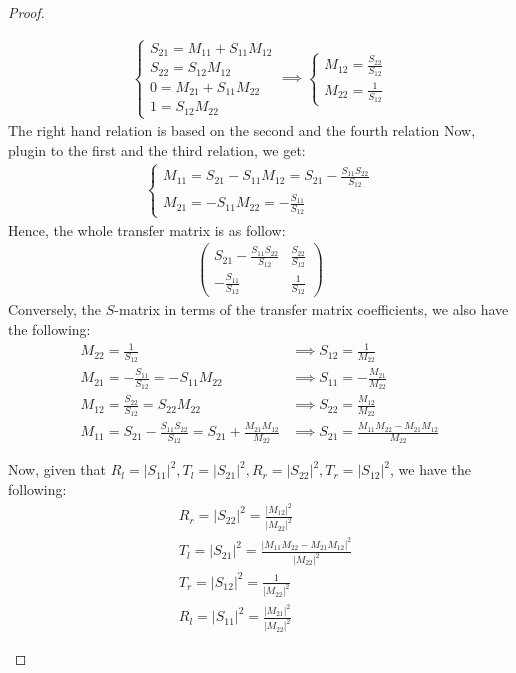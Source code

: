 \documentclass{article}
\begin{document}
\begin{proof}
\begin{itemize}
    \begin{align}
        \begin{cases}
            S_{21}=M_{11}+S_{11}M_{12}\\
            S_{22}=S_{12}M_{12}\\
            0=M_{21}+S_{11}M_{22}\\
            1=S_{12}M_{22}
        \end{cases}\implies \begin{cases}
            M_{12}=\frac{S_{22}}{S_{12}}\\
            M_{22}=\frac{1}{S_{12}}
        \end{cases}
    \end{align}
    The right hand relation is based on the second and the fourth relation Now, plugin to the first and the third relation, we get:
    \begin{align}
        \begin{cases}
            M_{11} = S_{21}-S_{11}M_{12} = S_{21}-\frac{S_{11}S_{22}}{S_{12}}\\
            M_{21} = -S_{11}M_{22}=-\frac{S_{11}}{S_{12}}
        \end{cases}
    \end{align}
    Hence, the whole transfer matrix is as follow:
    \begin{align}
        \begin{pmatrix}
            S_{21}-\frac{S_{11}S_{22}}{S_{12}} & \frac{S_{22}}{S_{12}}\\ -\frac{S_{11}}{S_{12}} & \frac{1}{S_{12}}
        \end{pmatrix}
    \end{align}
    Conversely, the $S$-matrix in terms of the transfer matrix coefficients, we also have the following:
    \begin{align}
            M_{22}=\frac{1}{S_{12}}&\implies S_{12}=\frac{1}{M_{22}}\\
            M_{21}=-\frac{S_{11}}{S_{12}} = -S_{11}M_{22}&\implies S_{11}=-\frac{M_{21}}{M_{22}}\\
            M_{12}=\frac{S_{22}}{S_{12}}=S_{22}M_{22}&\implies S_{22}=\frac{M_{12}}{M_{22}}\\
            M_{11}=S_{21}-\frac{S_{11}S_{22}}{S_{12}} = S_{21}+\frac{M_{21}M_{12}}{M_{22}}&\implies S_{21} = \frac{M_{11}M_{22}-M_{21}M_{12}}{M_{22}}
    \end{align}

    Now, given that $R_l=|S_{11}|^2, T_l=|S_{21}|^2, R_r=|S_{22}|^2, T_r=|S_{12}|^2$, we have the following:
    \begin{align}
        &R_r = |S_{22}|^2 = \frac{|M_{12}|^2}{|M_{22}|^2}\\
        &T_l = |S_{21}|^2 = \frac{|M_{11}M_{22}-M_{21}M_{12}|^2}{|M_{22}|^2}\\
        &T_r = |S_{12}|^2 = \frac{1}{|M_{22}|^2}\\
        &R_l = |S_{11}|^2 = \frac{|M_{21}|^2}{|M_{22}|^2}
    \end{align}


\end{itemize}
\end{proof}
\end{document}
